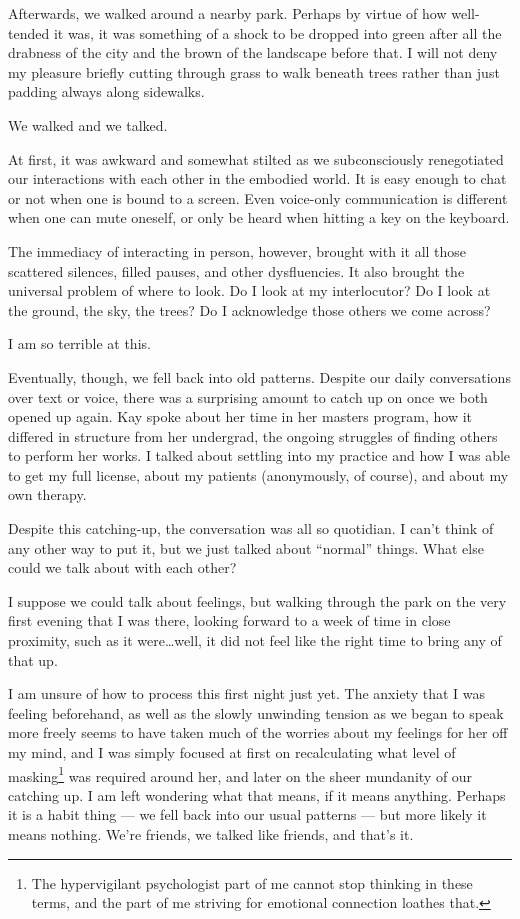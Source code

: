 Afterwards, we walked around a nearby park. Perhaps by virtue of how well-tended it was, it was something of a shock to be dropped into green after all the drabness of the city and the brown of the landscape before that. I will not deny my pleasure briefly cutting through grass to walk beneath trees rather than just padding always along sidewalks.

We walked and we talked.

At first, it was awkward and somewhat stilted as we subconsciously renegotiated our interactions with each other in the embodied world. It is easy enough to chat or not when one is bound to a screen. Even voice-only communication is different when one can mute oneself, or only be heard when hitting a key on the keyboard.

The immediacy of interacting in person, however, brought with it all those scattered silences, filled pauses, and other dysfluencies. It also brought the universal problem of where to look. Do I look at my interlocutor? Do I look at the ground, the sky, the trees? Do I acknowledge those others we come across?

I am so terrible at this.

Eventually, though, we fell back into old patterns. Despite our daily conversations over text or voice, there was a surprising amount to catch up on once we both opened up again. Kay spoke about her time in her masters program, how it differed in structure from her undergrad, the ongoing struggles of finding others to perform her works. I talked about settling into my practice and how I was able to get my full license, about my patients (anonymously, of course), and about my own therapy.

Despite this catching-up, the conversation was all so quotidian. I can't think of any other way to put it, but we just talked about ``normal'' things. What else could we talk about with each other?

I suppose we could talk about feelings, but walking through the park on the very first evening that I was there, looking forward to a week of time in close proximity, such as it were\ldots well, it did not feel like the right time to bring any of that up.

I am unsure of how to process this first night just yet. The anxiety that I was feeling beforehand, as well as the slowly unwinding tension as we began to speak more freely seems to have taken much of the worries about my feelings for her off my mind, and I was simply focused at first on recalculating what level of masking\footnote{The hypervigilant psychologist part of me cannot stop thinking in these terms, and the part of me striving for emotional connection loathes that.} was required around her, and later on the sheer mundanity of our catching up. I am left wondering what that means, if it means anything. Perhaps it is a habit thing --- we fell back into our usual patterns --- but more likely it means nothing. We're friends, we talked like friends, and that's it.

